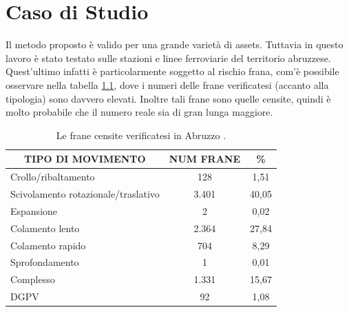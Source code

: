
\chapter{Caso di Studio} %
Il metodo proposto è valido per una grande varietà di assets. Tuttavia in questo lavoro è stato testato sulle stazioni e linee ferroviarie del territorio abruzzese. Quest'ultimo infatti è particolarmente soggetto al rischio frana, com'è possibile osservare nella tabella \ref{tab:riassunto_frane}, dove i numeri delle frane verificatesi (accanto alla tipologia) sono davvero elevati. Inoltre tali frane sono quelle censite, quindi è molto probabile che il numero reale sia di gran lunga maggiore.

\begin{table}[h]
	\centering
	\caption{Le frane censite verificatesi in Abruzzo \cite{d200718}.}
	\label{tab:riassunto_frane}
	\begin{tabular}{|l|c|c|}
		\hline
		\multicolumn{1}{|c|}{\cellcolor{gray!50} \textbf{TIPO DI MOVIMENTO}} & {\cellcolor{gray!50}\textbf{NUM FRANE}} & {\cellcolor{gray!50} \textbf{\%}} \\ \hline
		Crollo/ribaltamento & 128  & 1,51   \\ \hline
		Scivolamento rotazionale/traslativo  & 3.401  & 40,05                              \\ \hline
		Espansione                                                                                      & 2                                        & 0,02                               \\ \hline
		Colamento lento                                                                                 & 2.364                                    & 27,84                              \\ \hline
		Colamento rapido                                                                                & 704                                      & 8,29                               \\ \hline
		Sprofondamento                                                                                  & 1                                        & 0,01                               \\ \hline
		Complesso                                                                                       & 1.331                                    & 15,67                              \\ \hline
		DGPV                                                                                            & 92                                       & 1,08                               \\ \hline

\end{tabular}
\end{table}
